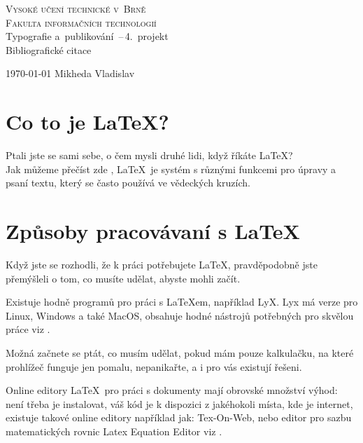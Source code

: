 \documentclass[a4paper,11pt]{article}
\begin{document}
\begin{titlepage}
    \begin{center}
        \Huge
        \textsc{Vysoké učení technické v~Brně\\
               \huge Fakulta informačních technologií}\\
               
        \LARGE
                Typografie a~publikování \,--\,4.~projekt\\
                \Huge Bibliografické citace\\
    \end{center}
    {\Large \today \hfill
                Mikheda Vladislav}
\end{titlepage}


\section{Co to je \LaTeX?}
Ptali jste se sami sebe, o čem mysli druhé lidi, když říkáte \LaTeX?\\
Jak můžeme přečíst zde \cite{LamportLeslie1994L:ad}, \LaTeX~je systém s různými funkcemi pro úpravy a psaní textu, který se často používá ve vědeckých kruzích. 

\section{Způsoby pracovávaní s \LaTeX }

Když jste se rozhodli, že k práci potřebujete \LaTeX , pravděpodobně jste přemýšleli o tom, co musíte udělat, abyste mohli začít.

Existuje hodně programů pro práci s \LaTeX em, například LyX. Lyx má verze pro Linux, Windows a také MacOS, obsahuje hodné nástrojů potřebných pro skvělou práce viz \cite{KyselakAntonin}.

Možná začnete se ptát, co musím udělat, pokud mám pouze kalkulačku, na které prohlížeč funguje jen pomalu, nepanikařte, a i pro vás existují řešeni.

Online editory \LaTeX ~pro práci s dokumenty mají obrovské množství výhod: není třeba je instalovat, váš kód je k dispozici z jakéhokoli místa, kde je internet, existuje takové online editory například jak: Tex-On-Web, nebo editor pro sazbu matematických rovnic Latex Equation Editor viz \cite{SokolMiroslav2012OLe}.
\end{document}
